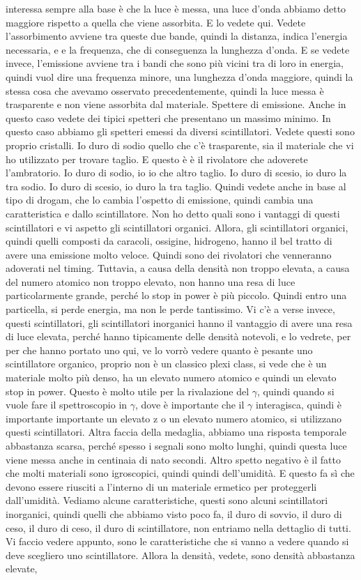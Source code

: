 {interessa sempre alla base è che la luce è messa, una luce d'onda abbiamo detto maggiore rispetto a quella che viene assorbita. E lo vedete qui. Vedete l'assorbimento avviene tra queste due bande, quindi la distanza, indica l'energia necessaria, e e la frequenza, che di conseguenza la lunghezza d'onda. E se vedete invece, l'emissione avviene tra i bandi che sono più vicini tra di loro in energia, quindi vuol dire una frequenza minore, una lunghezza d'onda maggiore, quindi la stessa cosa che avevamo osservato precedentemente, quindi la luce messa è trasparente e non viene assorbita dal materiale. Spettere di emissione. Anche in questo caso vedete dei tipici spetteri che presentano un massimo minimo. In questo caso abbiamo gli spetteri emessi da diversi scintillatori. Vedete questi sono proprio cristalli. Io duro di sodio quello che c'è trasparente, sia il materiale che vi ho utilizzato per trovare taglio. E questo è è il rivolatore che adoverete l'ambratorio. Io duro di sodio, io io che altro taglio. Io duro di scesio, io duro la tra sodio. Io duro di scesio, io duro la tra taglio. Quindi vedete anche in base al tipo di drogam, che lo cambia l'ospetto di emissione, quindi cambia una caratteristica e dallo scintillatore. Non ho detto quali sono i vantaggi di questi scintillatori e vi aspetto gli scintillatori organici. Allora, gli scintillatori organici, quindi quelli composti da caracoli, ossigine, hidrogeno, hanno il bel tratto di avere una emissione molto veloce. Quindi sono dei rivolatori che venneranno adoverati nel timing. Tuttavia, a causa della densità non troppo elevata, a causa del numero atomico non troppo elevato, non hanno una resa di luce particolarmente grande, perché lo stop in power è più piccolo. Quindi entro una particella, si perde energia, ma non le perde tantissimo. Vi c'è a verse invece, questi scintillatori, gli scintillatori inorganici hanno il vantaggio di avere una resa di luce elevata, perché hanno tipicamente delle densità notevoli, e lo vedrete, per per che hanno portato uno qui, ve lo vorrò vedere quanto è pesante uno scintillatore organico, proprio non è un classico plexi class, si vede che è un materiale molto più denso, ha un elevato numero atomico e quindi un elevato stop in power. Questo è molto utile per la rivalazione del $\gamma$, quindi quando si vuole fare il spettroscopio in $\gamma$, dove è importante che il $\gamma$ interagisca, quindi è importante importante un elevato z o un elevato numero atomico, si utilizzano questi scintillatori. Altra faccia della medaglia, abbiamo una risposta temporale abbastanza scarsa, perché spesso i segnali sono molto lunghi, quindi questa luce viene messa anche in centinaia di nato secondi. Altro spetto negativo è il fatto che molti materiali sono igroscopici, quindi quindi dell'umidità. E questo fa sì che devono essere riusciti a l'interno di un materiale ermetico per proteggerli dall'umidità. Vediamo alcune caratteristiche, questi sono alcuni scintillatori inorganici, quindi quelli che abbiamo visto poco fa, il duro di sovvio, il duro di ceso, il duro di ceso, il duro di scintillatore, non entriamo nella dettaglio di tutti. Vi faccio vedere appunto, sono le caratteristiche che si vanno a vedere quando si deve scegliero uno scintillatore. Allora la densità, vedete, sono densità abbastanza elevate, }
